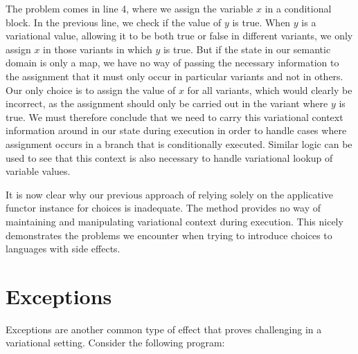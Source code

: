 \documentclass[12pt,oneside]{book}
\begin{document}
The problem comes in line 4, where we assign the variable $x$ in a conditional block. In the previous line, we check if the value of
$y$ is true. When $y$ is a variational value, allowing it to be both true or false in different variants, we only assign $x$ in those variants
in which $y$ is true. But if the state in our semantic domain is only a map, we have no way of passing the necessary information to the
assignment that it must only occur in particular variants and not in others. Our only choice is to assign the value of $x$ for all variants,
which would clearly be incorrect, as the assignment should only be carried out in the variant where $y$ is true. We must therefore
conclude that we need to carry this variational context information around in our state during execution in order to handle cases where
assignment occurs in a branch that is conditionally executed. Similar logic can be used to see that this context is also necessary to handle
variational lookup of variable values.

It is now clear why our previous approach of relying solely on the applicative functor instance for choices is inadequate. The method provides
no way of maintaining and manipulating variational context during execution. This nicely demonstrates the problems we encounter when
trying to introduce choices to languages with side effects.

%
%
%
% 

\section{Exceptions}
\label{sec:except}

Exceptions are another common type of effect that proves challenging in a variational setting.
Consider the following program:
\end{document}
